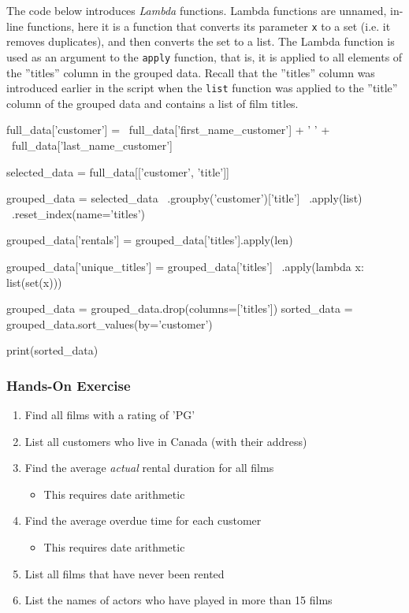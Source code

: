 The code below introduces \emph{Lambda} functions. Lambda functions are unnamed, in-line functions, here it is a function that converts its parameter \texttt{x} to a set (i.e. it removes duplicates), and then converts the set to a list. The Lambda function is used as an argument to the \texttt{apply} function, that is, it is applied to all elements of the ''titles'' column in the grouped data. Recall that the ''titles'' column was introduced earlier in the script when the \texttt{list} function was applied to the ''title'' column of the grouped data and contains a list of film titles.

\begin{samepage}
\begin{pythoncode}
full_data['customer'] = \
    full_data['first_name_customer'] + ' ' + \
    full_data['last_name_customer']

selected_data = full_data[['customer', 'title']]

grouped_data = selected_data \
        .groupby('customer')['title'] \
        .apply(list) \
        .reset_index(name='titles')
        
grouped_data['rentals'] = grouped_data['titles'].apply(len)

grouped_data['unique_titles'] = grouped_data['titles'] \
        .apply(lambda x: list(set(x)))

grouped_data = grouped_data.drop(columns=['titles'])
sorted_data = grouped_data.sort_values(by='customer')

print(sorted_data)
\end{pythoncode}
\end{samepage}

\begin{tcolorbox}[colback=code]
\subsubsection*{Hands-On Exercise}

\begin{enumerate}
  \item Find all films with a rating of 'PG'
  \item List all customers who live in Canada (with their address)
  \item Find the average \emph{actual} rental duration for all films
  \begin{itemize}
     \item This requires date arithmetic
  \end{itemize}
  \item Find the average overdue time for each customer
  \begin{itemize}
     \item This requires date arithmetic
  \end{itemize}
  \item List all films that have never been rented
  \item List the names of actors who have played in more than 15 films
\end{enumerate}
\end{tcolorbox}

